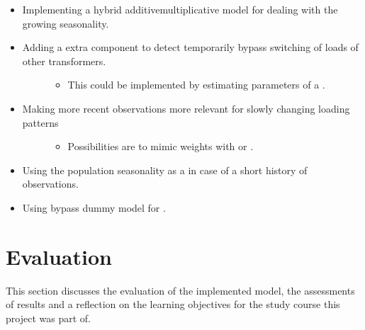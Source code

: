 \documentclass[letterpaper,10pt,english]{sphinxmanual}
\begin{document}
\begin{itemize}
\item {} 
Implementing a hybrid additive\sphinxhyphen{}multiplicative model for dealing with the growing seasonality.

\item {} \begin{description}
\item[{Adding a extra component to detect temporarily bypass switching of loads of other transformers.}] \leavevmode\begin{itemize}
\item {} 
This could be implemented by estimating parameters of a .

\end{itemize}

\end{description}

\item {} \begin{description}
\item[{Making more recent observations more relevant for slowly changing loading patterns}] \leavevmode\begin{itemize}
\item {} 
Possibilities are to mimic weights with  or .

\end{itemize}

\end{description}

\item {} 
Using the population seasonality as a  in case of a short history of observations.

\item {} 
Using by\sphinxhyphen{}pass dummy model for .

\end{itemize}


\chapter{Evaluation}
\label{\detokenize{evaluation:evaluation}}\label{\detokenize{evaluation::doc}}
This section discusses the evaluation of the implemented model, the assessments of results and a reflection on the learning objectives for the study course this project was part of.
\end{document}
